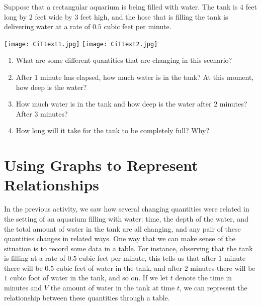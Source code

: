 \documentclass{ximera}
\begin{document}
\begin{exploration}
Suppose that a rectangular aquarium is being filled with water.  The tank is $4$ feet long by $2$ feet wide by $3$ feet high, and the hose that is filling the tank is delivering water at a rate of $0.5$ cubic feet per minute.

\begin{image}
\texttt{[image: CiTtext1.jpg]}
\texttt{[image: CiTtext2.jpg]}
\end{image}

\begin{enumerate}[label=\alph*.]
\item What are some different quantities that are changing in this scenario?%
\item After $1$ minute has elapsed, how much water is in the tank?  At this moment, how deep is the water?%
\item How much water is in the tank and how deep is the water after $2$ minutes?  After $3$ minutes?%
\item How long will it take for the tank to be completely full?  Why?%
\end{enumerate}
\end{exploration}



\section{Using Graphs to Represent Relationships}
In the previous activity, we saw how several changing quantities were related in the setting of an aquarium filling with water: time, the depth of the water, and the total amount of water in the tank are all changing, and any pair of these quantities changes in related ways.  One way that we can make sense of the situation is to record some data in a table.  For instance, observing that the tank is filling at a rate of $0.5$ cubic feet per minute, this tells us that after $1$ minute there will be $0.5$ cubic feet of water in the tank, and after $2$ minutes there will be $1$ cubic foot of water in the tank, and so on.  If we let $t$ denote the time in minutes and $V$ the amount of water in the tank at time $t$, we can represent the relationship between these quantities through a table.%
\end{document}
